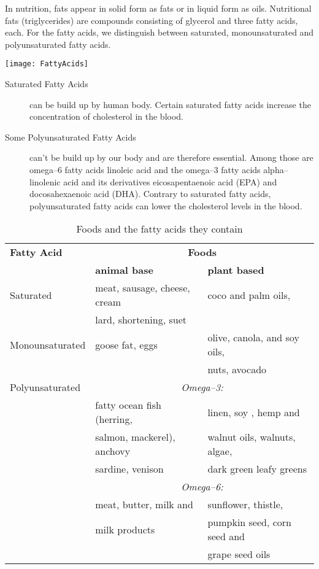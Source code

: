 \documentclass[../main.tex]{subfiles}
\begin{document}
In nutrition, fats appear in solid form as fats or in liquid form as oils.
Nutritional fats (triglycerides) are compounds consisting of glycerol and three fatty acids, each.
For the fatty acids, we distinguish  between saturated,
monounsaturated and polyunsaturated fatty acids.

\vspace{3mm}
{\centering
  \texttt{[image: FattyAcids]}
}

\begin{description}
\item[Saturated Fatty Acids] can be build up by human body.
  Certain saturated fatty acids increase the concentration of cholesterol in the blood.
\item[Some Polyunsaturated Fatty Acids] can't be build up by our body and are therefore essential.
  Among those are omega--6 fatty acids linoleic acid and the
  omega--3 fatty acids alpha--linolenic acid and its derivatives
  eicosapentaenoic acid (EPA) and docosahexaenoic acid (DHA).
  Contrary to saturated fatty acids, polyunsaturated fatty acids can lower the cholesterol levels in the blood.
\end{description}

\begin{table}[htb!]
  \centering
  \begin{tabular}{l|ll}
    \textbf{Fatty Acid} & \multicolumn{2}{c}{\textbf{Foods}} \\
                        & \textbf{animal base} & \textbf{plant based} \\
    \hline
    Saturated & meat, sausage, cheese, cream & coco and palm oils, \\
                        & lard, shortening, suet \\
    Monounsaturated & goose fat, eggs & olive, canola, and soy oils, \\
                        & & nuts, avocado \\
    Polyunsaturated & \multicolumn{2}{c}{\textit{Omega--3:}} \\
                        & fatty ocean fish (herring,  & linen, soy , hemp and \\
                        & salmon, mackerel), anchovy & walnut oils, walnuts, algae,\\
                        & sardine, venison & dark green leafy greens \\
  & \multicolumn{2}{c}{\textit{Omega--6:}} \\  
                        & meat, butter, milk and & sunflower, thistle, \\
                        & milk products & pumpkin seed, corn seed and \\
                        & & grape seed oils \\

  \end{tabular}
  \caption{Foods and the fatty acids they contain}
\end{table}
\end{document}
